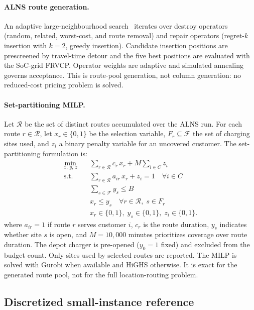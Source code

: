 \documentclass[review,3p,authoryear]{elsarticle}
\newcommand{\cR}{\mathcal{R}}
\begin{document}
\paragraph{ALNS route generation.}
An adaptive large-neighbourhood search~\citep{Ropke2006} iterates over
destroy operators (random, related, worst-cost, and route removal)
and repair operators (regret-$k$ insertion with $k=2$, greedy insertion).
Candidate insertion positions are prescreened by travel-time detour and the
five best positions are evaluated with the SoC-grid FRVCP.  Operator weights
are adaptive and simulated annealing governs acceptance.  This is route-pool
generation, not column generation: no reduced-cost pricing problem is solved.

\paragraph{Set-partitioning MILP.}
Let $\cR$ be the set of distinct routes accumulated over the ALNS run.
For each route $r \in \cR$, let $x_r \in \{0, 1\}$ be the selection
variable, $F_r \subseteq \mathcal{F}$ the set of charging sites used, and
$z_i$ a binary penalty variable for an uncovered customer.  The
set-partitioning formulation is:
\begin{align}
  \min_{x,\,y,\,z} \quad & \sum_{r \in \cR} c_r\,x_r
    + M\sum_{i\in C}z_i \label{eq:milp_obj}\\
  \text{s.t.} \quad & \sum_{r \in \cR} a_{ir}\,x_r + z_i = 1
    \quad \forall i \in C \label{eq:milp_cover}\\
  & \sum_{s \in \mathcal{F}} y_s \le B \label{eq:milp_budget}\\
  & x_r \le y_s \quad \forall r \in \cR,\; s \in F_r
    \label{eq:milp_site}\\
  & x_r \in \{0, 1\},\; y_s \in \{0, 1\},\; z_i \in \{0,1\}.
    \label{eq:milp_bin}
\end{align}
where $a_{ir} = 1$ if route $r$ serves customer $i$, $c_r$ is the
route duration, $y_s$ indicates whether site $s$ is open, and
$M=10{,}000$ minutes prioritizes coverage over route duration.  The depot
charger is pre-opened ($y_0 = 1$ fixed) and excluded from the budget
count.  Only sites used by selected routes are reported.  The MILP is solved
with Gurobi when available and HiGHS otherwise.  It is exact for the
generated route pool, not for the full location-routing problem.

\subsection{Discretized small-instance reference}
\label{sec:exact}
\end{document}
